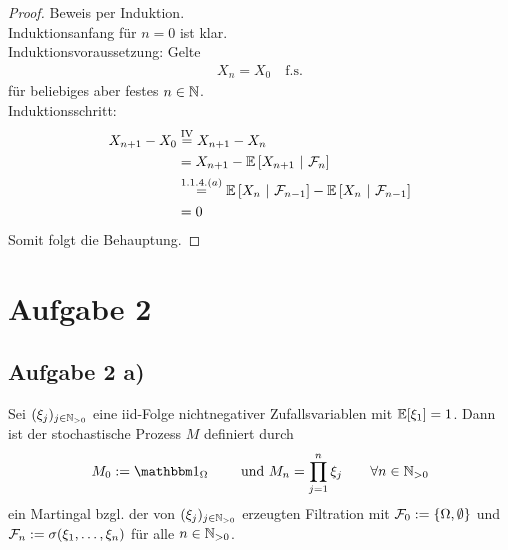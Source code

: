 \documentclass[12pt,a4paper]{article}
\begin{document}
\begin{proof}
	Beweis per Induktion.\\
	Induktionsanfang für $n=0$ ist klar.\\
	Induktionsvoraussetzung: Gelte
	\begin{align*}
		X_n = X_0 \quad \text{f.s.}
	\end{align*}
	für beliebiges aber festes $n\in\mathbb{N}$.\\
	Induktionsschritt:
	\begin{align*}
		X_{n+1}-X_0
		&\stackrel{\text{IV}}{=} X_{n+1} - X_{n} \\
		&= X_{n+1} - \mathbb{E}\left[{X_{n+1}}~|~{\mathcal{F}_{n}}\right] \\
		&\stackrel{1.1.4.(a)}{=} \mathbb{E}\left[{X_n}~|~{\mathcal{F}_{n-1}}\right] - \mathbb{E}\left[{X_n}~|~{\mathcal{F}_{n-1}}\right] \\
		&= 0
	\end{align*}
Somit folgt die Behauptung.
\end{proof}

\section*{Aufgabe 2}
\subsection*{Aufgabe 2 a)}
Sei $(\xi_j)_{j\in\mathbb{N}_{>0}}$ eine iid-Folge nichtnegativer Zufallsvariablen mit $\mathbb{E}[\xi_1]=1$. Dann ist der stochastische Prozess $M$ definiert durch
\begin{align*}
M_0:=\indi_\Omega\qquad\text{ und }M_n=\prod\limits_{j=1}^n\xi_j\qquad\forall n\in\N_{>0}
\end{align*}
ein Martingal bzgl. der von $(\xi_j)_{j\in\mathbb{N}_{>0}}$ erzeugten Filtration  mit $\mathcal{F}_0:=\lbrace \Omega,\emptyset\rbrace$ und $\mathcal{F}_n:=\sigma(\xi_1,\ldots,\xi_n)$ für alle $n\in\mathbb{N}_{>0}$.
\end{document}
